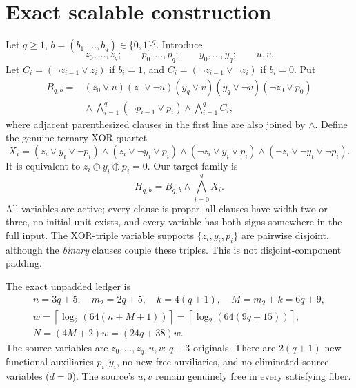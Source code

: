 \documentclass[11pt]{article}
\begin{document}
\section{Exact scalable construction}
Let $q\ge1$, $b=(b_1,\ldots,b_q)\in\{0,1\}^q$.
Introduce
\[
z_0,\ldots,z_q;\qquad p_0,\ldots,p_q;\qquad
y_0,\ldots,y_q;\qquad u,v.
\]
Let $C_i=(\neg z_{i-1}\vee z_i)$ if $b_i=1$, and
$C_i=(\neg z_{i-1}\vee\neg z_i)$ if $b_i=0$.
Put
\[
\begin{split}
B_{q,b}={}&(z_0\vee u)(z_0\vee\neg u)
(y_q\vee v)(y_q\vee\neg v)(\neg z_0\vee p_0)\\[-2pt]
&{}\land\bigwedge_{i=1}^{q}(\neg p_{i-1}\vee p_i)
\land\bigwedge_{i=1}^{q}C_i,
\end{split}
\]
where adjacent parenthesized clauses in the first line are also joined
by $\wedge$. Define the genuine ternary XOR quartet
\[
X_i=(z_i\vee y_i\vee\neg p_i)
\land(z_i\vee\neg y_i\vee p_i)
\land(\neg z_i\vee y_i\vee p_i)
\land(\neg z_i\vee\neg y_i\vee\neg p_i).
\]
It is equivalent to $z_i\oplus y_i\oplus p_i=0$.
Our target family is
\[
\boxed{H_{q,b}=B_{q,b}\wedge\bigwedge_{i=0}^{q}X_i.}
\tag{1}
\]
All variables are active; every clause is proper, all clauses have
width two or three, no initial unit exists, and every variable has
both signs somewhere in the full input.
The XOR-triple variable supports
$\{z_i,y_i,p_i\}$ are pairwise disjoint, although the \emph{binary}
clauses couple these triples. This is not disjoint-component padding.

The exact unpadded ledger is
\[
\begin{gathered}
n=3q+5,\quad m_2=2q+5,\quad k=4(q+1),\quad
M=m_2+k=6q+9,\\
w=\left\lceil\log_2(64(n+M+1))\right\rceil
=\left\lceil\log_2(64(9q+15))\right\rceil,\\
\boxed{N=(4M+2)w=(24q+38)w.}\tag{2}
\end{gathered}
\]
The source variables are $z_0,\ldots,z_q,u,v$: $q+3$ originals.
There are $2(q+1)$ new functional auxiliaries $p_i,y_i$,
no new free auxiliaries, and no eliminated source variables ($d=0$).
The source's $u,v$ remain genuinely free in every satisfying fiber.
\end{document}
